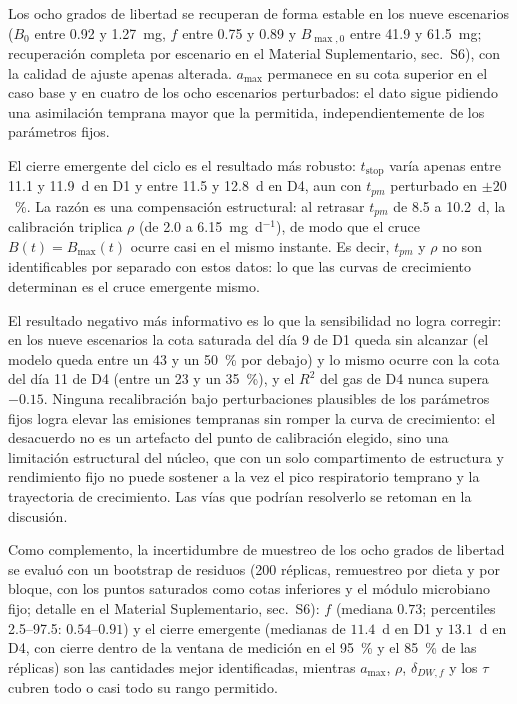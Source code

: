 Los ocho grados de libertad se recuperan de forma estable en los nueve escenarios ($B_0$ entre 0.92 y 1.27~mg, $f$ entre 0.75 y 0.89 y $B_{\max,0}$ entre 41.9 y 61.5~mg; recuperación completa por escenario en el Material Suplementario, sec.~S6), con la calidad de ajuste apenas alterada. $a_{\max}$ permanece en su cota superior en el caso base y en cuatro de los ocho escenarios perturbados: el dato sigue pidiendo una asimilación temprana mayor que la permitida, independientemente de los parámetros fijos.

El cierre emergente del ciclo es el resultado más robusto: $t_{\mathrm{stop}}$ varía apenas entre 11.1 y 11.9~d en D1 y entre 11.5 y 12.8~d en D4, aun con $t_{pm}$ perturbado en $\pm 20$~\%. La razón es una compensación estructural: al retrasar $t_{pm}$ de 8.5 a 10.2~d, la calibración triplica $\rho$ (de 2.0 a 6.15~mg~d$^{-1}$), de modo que el cruce $B(t) = B_{\max}(t)$ ocurre casi en el mismo instante. Es decir, $t_{pm}$ y $\rho$ no son identificables por separado con estos datos: lo que las curvas de crecimiento determinan es el cruce emergente mismo.

El resultado negativo más informativo es lo que la sensibilidad no logra corregir: en los nueve escenarios la cota saturada del día 9 de D1 queda sin alcanzar (el modelo queda entre un 43 y un 50~\% por debajo) y lo mismo ocurre con la cota del día 11 de D4 (entre un 23 y un 35~\%), y el $R^2$ del gas de D4 nunca supera $-0.15$. Ninguna recalibración bajo perturbaciones plausibles de los parámetros fijos logra elevar las emisiones tempranas sin romper la curva de crecimiento: el desacuerdo no es un artefacto del punto de calibración elegido, sino una limitación estructural del núcleo, que con un solo compartimento de estructura y rendimiento fijo no puede sostener a la vez el pico respiratorio temprano y la trayectoria de crecimiento. Las vías que podrían resolverlo se retoman en la discusión.

Como complemento, la incertidumbre de muestreo de los ocho grados de libertad se evaluó con un bootstrap de residuos (200 réplicas, remuestreo por dieta y por bloque, con los puntos saturados como cotas inferiores y el módulo microbiano fijo; detalle en el Material Suplementario, sec.~S6): $f$ (mediana $0.73$; percentiles 2.5--97.5: $0.54$--$0.91$) y el cierre emergente (medianas de $11.4$~d en D1 y $13.1$~d en D4, con cierre dentro de la ventana de medición en el 95~\% y el 85~\% de las réplicas) son las cantidades mejor identificadas, mientras $a_{\max}$, $\rho$, $\delta_{DW,f}$ y los $\tau$ cubren todo o casi todo su rango permitido.

